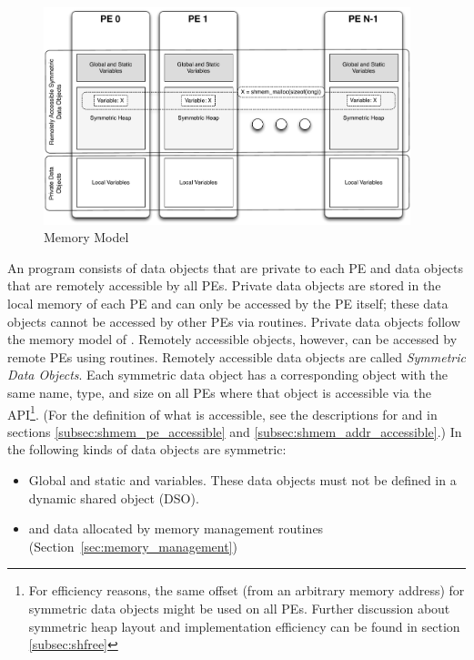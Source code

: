 \begin{figure}[h]
\includegraphics[width=0.95\textwidth]{figures/mem_model}
\caption{\openshmem Memory Model}
\label{fig:mem_model}
\end{figure}
%
An \openshmem program consists of data objects that are private to each \ac{PE}
and data  objects that are remotely accessible by all \acp{PE}. Private data
objects are stored in the local memory of each \ac{PE} and can only be accessed
by the \ac{PE} itself; these data objects cannot be accessed by other \acp{PE}
via \openshmem routines. Private data objects follow the memory model of
\Cstd. Remotely accessible objects, however, can be accessed by
remote \acp{PE} using \openshmem routines.  Remotely accessible data objects are
called \emph{Symmetric Data Objects}.  Each symmetric data object has a
corresponding object with the same name, type, and size on all \acp{PE} where that object is
accessible via the \openshmem \ac{API}\footnote{For efficiency reasons,
the same offset (from an arbitrary memory address) for symmetric data
objects might be used on all \acp{PE}. Further discussion about symmetric heap
layout and implementation efficiency can be found in section
\ref{subsec:shfree}}.  (For the definition of what is accessible, see the
descriptions for  and 
in sections \ref{subsec:shmem_pe_accessible} and
\ref{subsec:shmem_addr_accessible}.) In \openshmem the following kinds of
data objects are symmetric:
%
\begin{itemize}
\item Global and static \Cstd and \Cpp variables. These data objects must
  not be defined in a dynamic shared object (DSO).
\item \Cstd and \Cpp data allocated by \openshmem memory management routines
  (Section~\ref{sec:memory_management})
\end{itemize}

